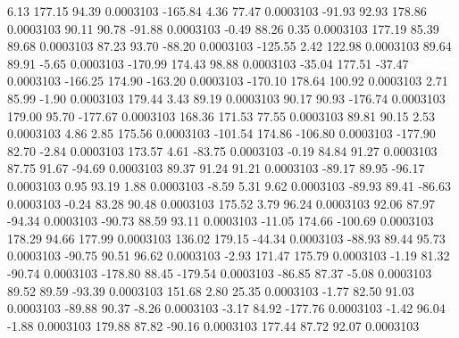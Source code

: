         6.13      177.15       94.39     0.0003103
     -165.84        4.36       77.47     0.0003103
      -91.93       92.93      178.86     0.0003103
       90.11       90.78      -91.88     0.0003103
       -0.49       88.26        0.35     0.0003103
      177.19       85.39       89.68     0.0003103
       87.23       93.70      -88.20     0.0003103
     -125.55        2.42      122.98     0.0003103
       89.64       89.91       -5.65     0.0003103
     -170.99      174.43       98.88     0.0003103
      -35.04      177.51      -37.47     0.0003103
     -166.25      174.90     -163.20     0.0003103
     -170.10      178.64      100.92     0.0003103
        2.71       85.99       -1.90     0.0003103
      179.44        3.43       89.19     0.0003103
       90.17       90.93     -176.74     0.0003103
      179.00       95.70     -177.67     0.0003103
      168.36      171.53       77.55     0.0003103
       89.81       90.15        2.53     0.0003103
        4.86        2.85      175.56     0.0003103
     -101.54      174.86     -106.80     0.0003103
     -177.90       82.70       -2.84     0.0003103
      173.57        4.61      -83.75     0.0003103
       -0.19       84.84       91.27     0.0003103
       87.75       91.67      -94.69     0.0003103
       89.37       91.24       91.21     0.0003103
      -89.17       89.95      -96.17     0.0003103
        0.95       93.19        1.88     0.0003103
       -8.59        5.31        9.62     0.0003103
      -89.93       89.41      -86.63     0.0003103
       -0.24       83.28       90.48     0.0003103
      175.52        3.79       96.24     0.0003103
       92.06       87.97      -94.34     0.0003103
      -90.73       88.59       93.11     0.0003103
      -11.05      174.66     -100.69     0.0003103
      178.29       94.66      177.99     0.0003103
      136.02      179.15      -44.34     0.0003103
      -88.93       89.44       95.73     0.0003103
      -90.75       90.51       96.62     0.0003103
       -2.93      171.47      175.79     0.0003103
       -1.19       81.32      -90.74     0.0003103
     -178.80       88.45     -179.54     0.0003103
      -86.85       87.37       -5.08     0.0003103
       89.52       89.59      -93.39     0.0003103
      151.68        2.80       25.35     0.0003103
       -1.77       82.50       91.03     0.0003103
      -89.88       90.37       -8.26     0.0003103
       -3.17       84.92     -177.76     0.0003103
       -1.42       96.04       -1.88     0.0003103
      179.88       87.82      -90.16     0.0003103
      177.44       87.72       92.07     0.0003103

